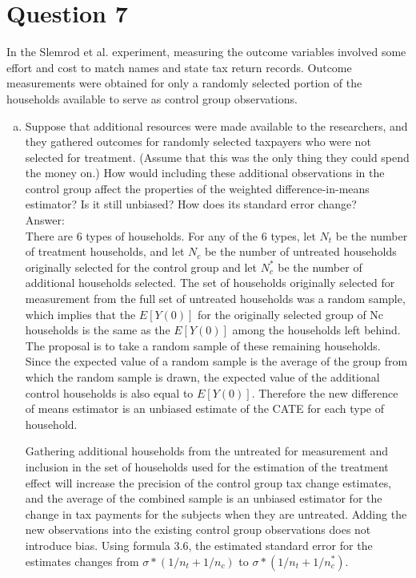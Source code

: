 \documentclass[11pt,notitlepage]{article}\usepackage[]{graphicx}\usepackage[]{color}
\begin{document}
\section*{Question 7}
In the Slemrod et al. experiment, measuring the outcome variables involved some effort and cost to match names and state tax return records. Outcome measurements were obtained for only a randomly selected portion of the households available to serve as control group observations.

\begin{enumerate}[a)]
\item Suppose that additional resources were made available to the researchers, and they gathered outcomes for randomly selected taxpayers who were not selected for treatment. (Assume that this was the only thing they could spend the money on.) How would including these additional observations in the control group affect the properties of the weighted difference-in-means estimator? Is it still unbiased? How does its standard error change?\\
Answer:\\
There are 6 types of households. For any of the 6 types, let $N_t$ be the number of treatment households, and let $N_c$ be the number of untreated households originally selected for the control group and let $N_c^{*}$ be the number of additional households selected. The set of households originally selected for measurement from the full set of untreated households was a random sample, which implies that the $E[Y(0)]$ for the originally selected group of Nc households is the same as the $E[Y(0)]$ among the households left behind. The proposal is to take a random sample of these remaining households. Since the expected value of a random sample is the average of the group from which the random sample is drawn, the expected value of the additional control households is also equal to $E[Y(0)]$. Therefore the new difference of means estimator is an unbiased estimate of the CATE for each type of household.

Gathering additional households from the untreated for measurement and inclusion in the set of households used for the estimation of the treatment effect will increase the precision of the control group tax change estimates, and the average of the combined sample is an unbiased estimator for the change in tax payments for the subjects when they are untreated. Adding the new observations into the existing control group observations does not introduce bias. Using formula 3.6, the estimated standard error for the estimates changes from $\sigma*(1/n_t + 1/n_c)$ to $\sigma*(1/n_t + 1/n_c^{*})$. 


\end{enumerate}
\end{document}
